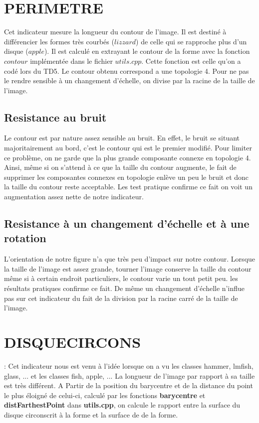 \documentclass{report}
\begin{document}
\section{PERIMETRE} Cet indicateur mesure la longueur du contour de l'image. Il est destiné à différencier les formes très courbés ($lizzard$) de celle qui se rapproche plus d'un disque ($apple$). Il est calculé en extrayant le contour de la forme avec la fonction $contour$ implémentée dans le fichier $utils.cpp$. Cette fonction est celle qu'on a codé lors du TD5. Le contour obtenu correspond a une topologie 4. 
Pour ne pas le rendre sensible à un changement d'échelle, on divise par la racine de la taille de l'image. 
\subsection*{Resistance au bruit}
Le contour est par nature assez sensible au bruit. 
En effet, le bruit se situant majoritairement au bord, c'est le contour qui est le premier modifié.
Pour limiter ce problème, on ne garde que la plus grande composante connexe en topologie 4.
Ainsi, même si on s'attend à ce que la taille du contour augmente, le fait de supprimer les composantes connexes en topologie enlève un peu le bruit et donc la taille du contour reste acceptable.
Les test pratique confirme ce fait on voit un augmentation assez nette de notre indicateur.


\subsection*{Resistance à un changement d'échelle et à une rotation}
L'orientation de notre figure n'a que très peu d'impact sur notre contour. 
Lorsque la taille de l'image est assez grande, tourner l'image conserve la taille du contour même si à certain endroit particuliers, le contour varie un tout petit peu. les résultats pratiques confirme ce fait.
De même un changement d'échelle n'influe pas sur cet indicateur du fait de la division par la racine carré de la taille de l'image.

\section{DISQUECIRCONS} : Cet indicateur nous est venu à l'idée lorsque on a vu les classes hammer, lmfish, glass, ... et les classes fish, apple, ...
La longueur de l'image par rapport à sa taille est très différent.   A Partir de la position du barycentre et de la distance du point le plus éloigné de celui-ci, calculé par les fonctions \textbf{barycentre} et \textbf{distFarthestPoint} dans \textbf{utils.cpp}, on calcule le rapport entre la surface du disque circonscrit à la forme et la surface de de la forme.
\end{document}

